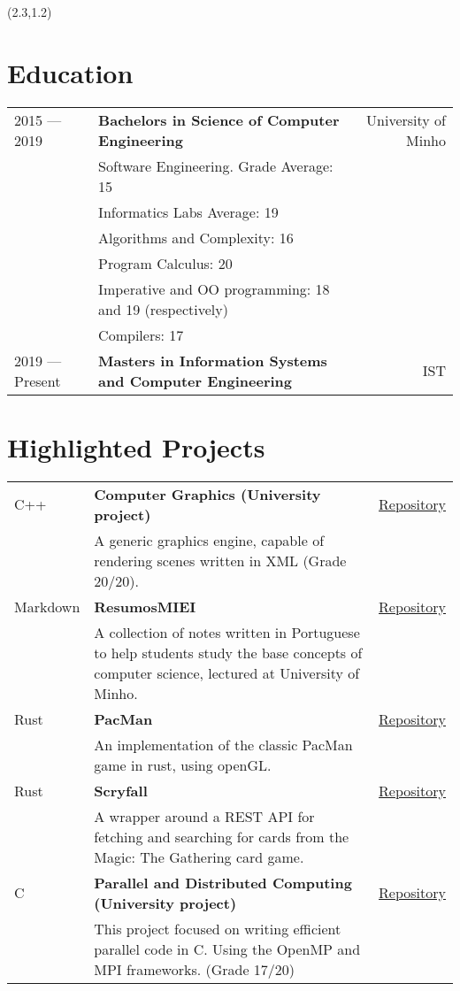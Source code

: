 \documentclass{article}
\begin{document}
\begin{textblock}{9.4} (2.3,1.2)

    \section{Education}
    \begin{tabular}{lp{8.4cm}r}
        2015 --- 2019 & \textbf{Bachelors in Science of Computer Engineering} & University of Minho\\
        & Software Engineering. Grade Average: 15 &\\
        & Informatics Labs Average: 19 & \\
        & Algorithms and Complexity: 16 & \\
        & Program Calculus: 20 & \\
        & Imperative and OO programming: 18 and 19 (respectively) &\\
        & Compilers: 17 &\\
        2019 --- Present & \textbf{Masters in Information Systems and Computer Engineering} & IST\\
    \end{tabular}

    \section{Highlighted Projects}
    \begin{tabular}{lp{10.4cm}r}
        C++ & \textbf{Computer Graphics (University project)} & \href{https://github.com/mendess/CG}{Repository}\\
        & A generic graphics engine, capable of rendering scenes written in XML (Grade 20/20). &\\
        Markdown & \textbf{ResumosMIEI} & \href{https://github.com/mendess/ResumosMIEI}{Repository}\\
        & A collection of notes written in Portuguese to help students
        study the base concepts of computer science, lectured at University of
        Minho. &\\
        Rust & \textbf{PacMan} & \href{https://github.com/mendess/rust-pacman}{Repository}\\
        & An implementation of the classic PacMan game in rust, using openGL.\@ &\\
        Rust & \textbf{Scryfall} & \href{https://github.com/mendess/scryfall-rs}{Repository}\\
        & A wrapper around a REST API for fetching and searching for cards from
        the Magic: The Gathering\texttrademark{} card game. &\\
        C & \textbf{Parallel and Distributed Computing (University project)} &
        \href{https://github.com/mendess/CPD}{Repository}\\
        & This project focused on writing efficient parallel code in C. Using
        the OpenMP and MPI frameworks. (Grade 17/20) &\\
    \end{tabular}


\end{textblock}
\end{document}
